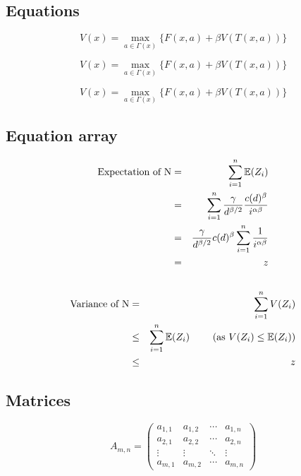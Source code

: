 \documentclass{article}
\begin{document}
\subsection{Equations}\label{subsec:eq}

$$
    V(x) = \max_{a \in \Gamma (x) } \{ F(x,a) + \beta V(T(x,a)) \}  \label{eq:bellman}
$$

\[
    V(x) = \max_{a \in \Gamma (x) } \{ F(x,a) + \beta V(T(x,a)) \}  \label{eq:bellman}
\]

\begin{equation}
    V(x) = \max_{a \in \Gamma (x) } \{ F(x,a) + \beta V(T(x,a)) \}  \label{eq:bellman}
\end{equation}


\subsection{Equation array}\label{subsec:eqarray}

\begin{eqnarray*}
    \mbox{Expectation of N} & = & \sum_{i=1}^{n} \mathbb{E}(Z_i) \\
                            & = & \sum_{i=1}^{n} \frac{\gamma}{d^{\beta/2}} \frac{ c(d)^\beta }{i^{\alpha\beta}} \\
                            & = & \frac{\gamma}{d^{\beta/2}} c(d)^\beta \sum_{i=1}^{n} \frac{1}{i^{\alpha\beta}} \\
                            & = & z \\
                            & ~ & \\
\end{eqnarray*}
\begin{eqnarray}
    \mbox{Variance of N} & = & \sum_{i=1}^{n} V(Z_i) \\
                         & \leq & \sum_{i=1}^{n} \mathbb{E}(Z_i) ~~~~~~~ (\mbox{as } V(Z_i) \leq \mathbb{E}(Z_i)) \\
                         & \leq & z  \nonumber
\end{eqnarray}


\subsection{Matrices}\label{subsec:matrices}

$$
    A_{m,n} =
    \begin{pmatrix}
        a_{1,1} & a_{1,2} & \cdots & a_{1,n} \\
        a_{2,1} & a_{2,2} & \cdots & a_{2,n} \\
        \vdots  & \vdots  & \ddots & \vdots  \\
        a_{m,1} & a_{m,2} & \cdots & a_{m,n}
    \end{pmatrix}
$$
\end{document}
